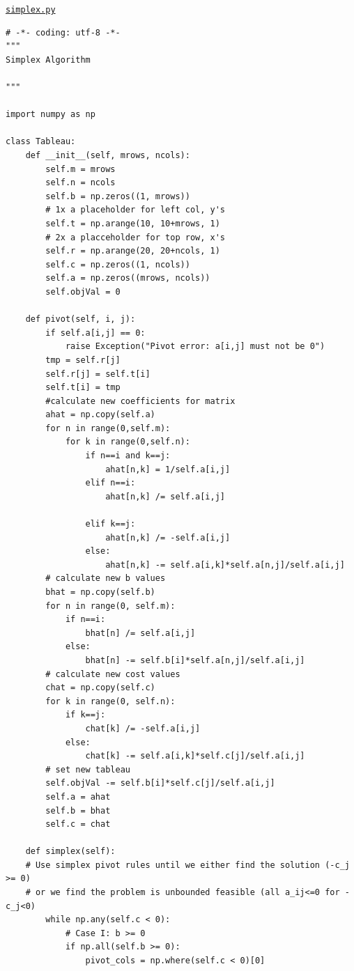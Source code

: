 \newpage
\underline{\texttt{simplex.py}}
\begin{scriptsize}
\begin{verbatim}
# -*- coding: utf-8 -*-
"""
Simplex Algorithm

"""

import numpy as np

class Tableau:    
    def __init__(self, mrows, ncols):
        self.m = mrows
        self.n = ncols
        self.b = np.zeros((1, mrows))
        # 1x a placeholder for left col, y's
        self.t = np.arange(10, 10+mrows, 1)
        # 2x a placceholder for top row, x's
        self.r = np.arange(20, 20+ncols, 1)
        self.c = np.zeros((1, ncols))
        self.a = np.zeros((mrows, ncols))
        self.objVal = 0
    
    def pivot(self, i, j):
        if self.a[i,j] == 0:
            raise Exception("Pivot error: a[i,j] must not be 0")
        tmp = self.r[j]
        self.r[j] = self.t[i]
        self.t[i] = tmp
        #calculate new coefficients for matrix
        ahat = np.copy(self.a)
        for n in range(0,self.m):
            for k in range(0,self.n):
                if n==i and k==j:
                    ahat[n,k] = 1/self.a[i,j]
                elif n==i:
                    ahat[n,k] /= self.a[i,j]
                    
                elif k==j:
                    ahat[n,k] /= -self.a[i,j]
                else:
                    ahat[n,k] -= self.a[i,k]*self.a[n,j]/self.a[i,j]
        # calculate new b values
        bhat = np.copy(self.b)
        for n in range(0, self.m):
            if n==i:
                bhat[n] /= self.a[i,j]   
            else:
                bhat[n] -= self.b[i]*self.a[n,j]/self.a[i,j]
        # calculate new cost values
        chat = np.copy(self.c)
        for k in range(0, self.n):
            if k==j:
                chat[k] /= -self.a[i,j]
            else:
                chat[k] -= self.a[i,k]*self.c[j]/self.a[i,j]
        # set new tableau
        self.objVal -= self.b[i]*self.c[j]/self.a[i,j]
        self.a = ahat
        self.b = bhat
        self.c = chat
    
    def simplex(self):
    # Use simplex pivot rules until we either find the solution (-c_j >= 0)
    # or we find the problem is unbounded feasible (all a_ij<=0 for -c_j<0)
        while np.any(self.c < 0):
            # Case I: b >= 0
            if np.all(self.b >= 0):
                pivot_cols = np.where(self.c < 0)[0]
                

\end{verbatim}
\end{scriptsize}
